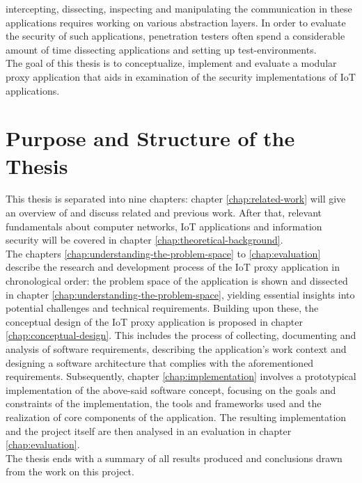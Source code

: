 intercepting, dissecting, inspecting and manipulating the communication in these applications requires working on various abstraction layers. In order to evaluate the security of such applications, penetration testers often spend a considerable amount of time dissecting applications and setting up test-environments.\\
The goal of this thesis is to conceptualize, implement and evaluate a modular proxy application that aids in examination of the security implementations of \ac{IoT} applications.%

\section{Purpose and Structure of the Thesis}
This thesis is separated into nine chapters: chapter \ref{chap:related-work} will give an overview of and discuss related and previous work. After that, relevant fundamentals about computer networks, \ac{IoT} applications and information security will be covered in chapter \ref{chap:theoretical-background}.\\
The chapters \ref{chap:understanding-the-problem-space} to \ref{chap:evaluation} describe the research and development process of the \ac{IoT} proxy application in chronological order: the problem space of the application is shown and dissected in chapter \ref{chap:understanding-the-problem-space}, yielding essential insights into potential challenges and technical requirements. Building upon these, the conceptual design of the \ac{IoT} proxy application is proposed in chapter \ref{chap:conceptual-design}. This includes the process of collecting, documenting and analysis of software requirements, describing the application's work context and designing a software architecture that complies with the aforementioned requirements. Subsequently, chapter \ref{chap:implementation} involves a prototypical implementation of the above-said software concept, focusing on the goals and constraints of the implementation, the tools and frameworks used and the realization of core components of the application. The resulting implementation and the project itself are then analysed in an evaluation in chapter \ref{chap:evaluation}.\\
The thesis ends with a summary of all results produced and conclusions drawn from the work on this project.